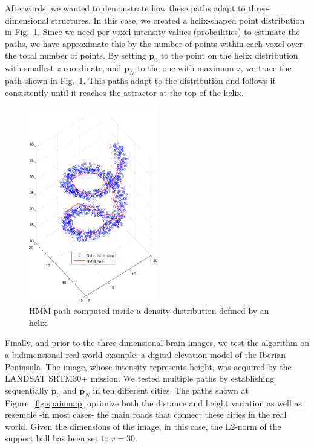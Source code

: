 Afterwards, we wanted to demonstrate how these paths adapt to three-di\-men\-sio\-nal structures. In this case, we created a helix-shaped point distribution in Fig.~\ref{fig:spire}. Since we need per-voxel intensity values (probailities) to estimate the paths, we have approximate this by the number of points within each voxel over the total number of points. By setting $\mathbf{p}_0$ to the point on the helix distribution with smallest $z$ coordinate, and $\mathbf{p}_N$ to the one with maximum $z$, we trace the path shown in Fig.~\ref{fig:spire}. This paths adapt to the distribution and follows it consistently until it reaches the attractor at the top of the helix.


\begin{figure}[p]
	\myfloatalign
		\includegraphics[width=0.5\textwidth]{Graphics/ch6/spire}
		\caption{\ac{HMM} path computed inside a density distribution defined by an helix.}
		\label{fig:spire}
\end{figure}

Finally, and prior to the three-dimensional brain images, we test the algorithm on a bidimensional real-world example: a digital elevation model of the Iberian Peninsula. The image, whose intensity represents height, was acquired by the LANDSAT SRTM30+ mission. We tested multiple paths by establishing sequentially $\mathbf{p}_0$ and $\mathbf{p}_N$ in ten different cities. The paths shown at Figure~\ref{fig:spainmap} optimize both the distance and height variation as well as resemble -in most cases- the main roads that connect these cities in the real world. Given the dimensions of the image, in this case, the L2-norm of the support ball has been set to $r=30$. 


